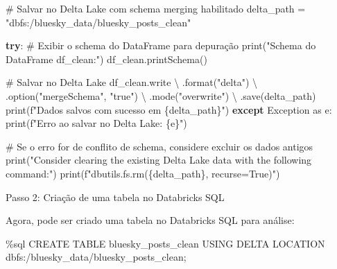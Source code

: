 \documentclass[
  letterpaper,
  DIV=11,
  numbers=noendperiod]{scrartcl}
\newenvironment{Shaded}{\begin{snugshade}}{\end{snugshade}}
\newcommand{\BuiltInTok}[1]{\textcolor[rgb]{0.00,0.23,0.31}{#1}}
\newcommand{\CommentTok}[1]{\textcolor[rgb]{0.37,0.37,0.37}{#1}}
\newcommand{\ControlFlowTok}[1]{\textcolor[rgb]{0.00,0.23,0.31}{\textbf{#1}}}
\newcommand{\ImportTok}[1]{\textcolor[rgb]{0.00,0.46,0.62}{#1}}
\newcommand{\NormalTok}[1]{\textcolor[rgb]{0.00,0.23,0.31}{#1}}
\newcommand{\OperatorTok}[1]{\textcolor[rgb]{0.37,0.37,0.37}{#1}}
\newcommand{\PreprocessorTok}[1]{\textcolor[rgb]{0.68,0.00,0.00}{#1}}
\newcommand{\SpecialCharTok}[1]{\textcolor[rgb]{0.37,0.37,0.37}{#1}}
\newcommand{\SpecialStringTok}[1]{\textcolor[rgb]{0.13,0.47,0.30}{#1}}
\newcommand{\StringTok}[1]{\textcolor[rgb]{0.13,0.47,0.30}{#1}}
\begin{document}
\begin{Shaded}
\begin{Highlighting}[]
\CommentTok{\# Salvar no Delta Lake com schema merging habilitado}
\NormalTok{delta\_path }\OperatorTok{=} \StringTok{"dbfs:/bluesky\_data/bluesky\_posts\_clean"}

\ControlFlowTok{try}\NormalTok{:}
    \CommentTok{\# Exibir o schema do DataFrame para depuração}
    \BuiltInTok{print}\NormalTok{(}\StringTok{"Schema do DataFrame df\_clean:"}\NormalTok{)}
\NormalTok{    df\_clean.printSchema()}

    \CommentTok{\# Salvar no Delta Lake}
\NormalTok{    df\_clean.write }\OperatorTok{\textbackslash{}}
\NormalTok{        .}\BuiltInTok{format}\NormalTok{(}\StringTok{"delta"}\NormalTok{) }\OperatorTok{\textbackslash{}}
\NormalTok{        .option(}\StringTok{"mergeSchema"}\NormalTok{, }\StringTok{"true"}\NormalTok{) }\OperatorTok{\textbackslash{}}
\NormalTok{        .mode(}\StringTok{"overwrite"}\NormalTok{) }\OperatorTok{\textbackslash{}}
\NormalTok{        .save(delta\_path)}
    \BuiltInTok{print}\NormalTok{(}\SpecialStringTok{f"Dados salvos com sucesso em }\SpecialCharTok{\{}\NormalTok{delta\_path}\SpecialCharTok{\}}\SpecialStringTok{"}\NormalTok{)}
\ControlFlowTok{except} \PreprocessorTok{Exception} \ImportTok{as}\NormalTok{ e:}
    \BuiltInTok{print}\NormalTok{(}\SpecialStringTok{f"Erro ao salvar no Delta Lake: }\SpecialCharTok{\{}\NormalTok{e}\SpecialCharTok{\}}\SpecialStringTok{"}\NormalTok{)}

    \CommentTok{\# Se o erro for de conflito de schema, considere excluir os dados antigos}
    \BuiltInTok{print}\NormalTok{(}\StringTok{"Consider clearing the existing Delta Lake data with the following command:"}\NormalTok{)}
    \BuiltInTok{print}\NormalTok{(}\SpecialStringTok{f"dbutils.fs.rm(\textquotesingle{}}\SpecialCharTok{\{}\NormalTok{delta\_path}\SpecialCharTok{\}}\SpecialStringTok{\textquotesingle{}, recurse=True)"}\NormalTok{)}
\end{Highlighting}
\end{Shaded}

Passo 2: Criação de uma tabela no Databricks SQL

Agora, pode ser criado uma tabela no Databricks SQL para análise:

\begin{Shaded}
\begin{Highlighting}[]
\OperatorTok{\%}\NormalTok{sql}
\NormalTok{CREATE TABLE bluesky\_posts\_clean}
\NormalTok{USING DELTA}
\NormalTok{LOCATION }\StringTok{\textquotesingle{}dbfs:/bluesky\_data/bluesky\_posts\_clean\textquotesingle{}}\OperatorTok{;}
\end{Highlighting}
\end{Shaded}
\end{document}

